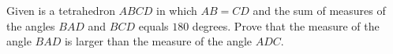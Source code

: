 Given is a tetrahedron $ABCD$ in which $AB=CD$ and the sum of measures of the angles $BAD$ and $BCD$ equals $180$ degrees. Prove that the measure of the angle $BAD$ is larger than the measure of the angle $ADC$.